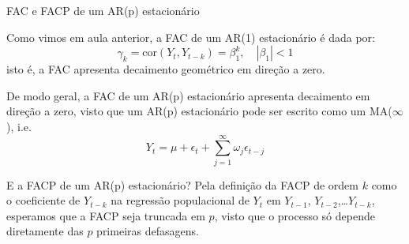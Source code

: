 \documentclass[11pt]{beamer}
\newenvironment{halfwideitemize}{\itemize\addtolength{\itemsep}{0.5em}}{\enditemize}
\begin{document}
\begin{frame}{FAC e FACP de um AR(p) estacionário}
	\begin{halfwideitemize}
		\item Como vimos em aula anterior, a FAC de um AR(1) estacionário é dada por:
		\begin{equation*}
			\gamma_k = \text{cor}(Y_t, Y_{t-k}) = \beta_1^k, \quad |\beta_1| < 1
		\end{equation*}
		isto é, a FAC apresenta decaimento geométrico em direção a zero.
		\item De modo geral, a FAC de um AR(p) estacionário apresenta {\color{blue}decaimento em direção a zero}, visto que um AR(p) estacionário pode ser escrito como um MA($\infty$), i.e.
		\begin{equation*}
			Y_t = \mu + \epsilon_t + \sum_{j=1}^\infty  \omega_j \epsilon_{t- j}
		\end{equation*}
		\item E a FACP de um AR(p) estacionário? Pela definição da FACP de ordem $k$ como o coeficiente de $Y_{t-k}$ na regressão populacional de $Y_t$ em $Y_{t-1}$, $Y_{t-2}$,\ldots $Y_{t-k}$, esperamos que a FACP seja {\color{blue} truncada em $p$}, visto que o processo só depende diretamente das $p$ primeiras defasagens.
	\end{halfwideitemize}
\end{frame}
\end{document}
